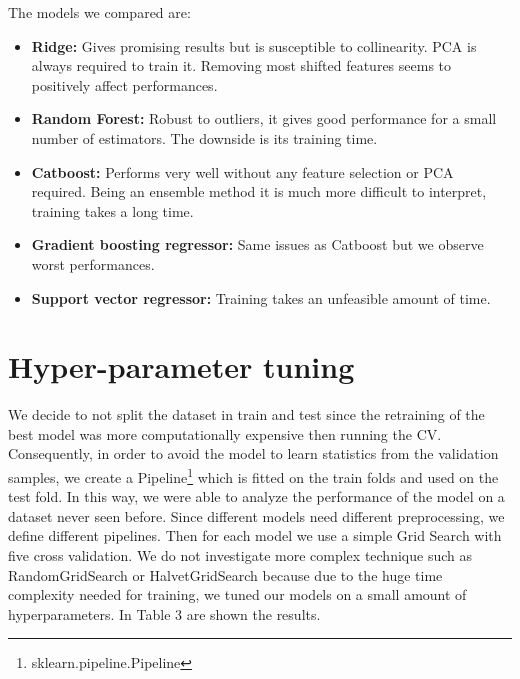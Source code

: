 \documentclass{article}
\begin{document}
    The models we compared are:
    \begin{itemize}
        \item \textbf{Ridge:} Gives promising results but is susceptible to collinearity. PCA is always required to train it. Removing most shifted features seems to positively affect performances.
        \item \textbf{Random Forest:} Robust to outliers, it gives good performance for a small number of estimators. The downside is its training time.
        \item \textbf{Catboost:} Performs very well without any feature selection or PCA required. Being an ensemble method it is much more difficult to interpret, training takes a long time.
        \item \textbf{Gradient boosting regressor:} Same issues as Catboost but we observe worst performances.
        \item \textbf{Support vector regressor:} Training takes an unfeasible amount of time.
    \end{itemize} 
    
    \section{Hyper-parameter tuning}
    We decide to not split the dataset in train and test since the retraining of the best model was more computationally expensive then running the CV. Consequently, in order to avoid the model to learn statistics from the validation samples, we create a Pipeline\footnote{sklearn.pipeline.Pipeline} which is fitted on the train folds and used on the test fold. In this way, we were able to analyze the performance of the model on a dataset never seen before.
    Since different models need different preprocessing, we define different pipelines. Then for each model we use a simple Grid Search with five cross validation. We do not investigate more complex technique such as RandomGridSearch or HalvetGridSearch because due to the huge time complexity needed for training, we tuned our models on a small amount of hyperparameters. In Table 3 are shown the results.
    
\end{document}

